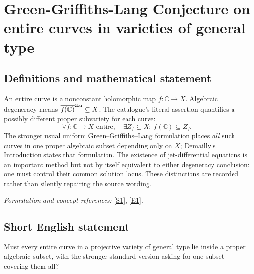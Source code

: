 \documentclass[11pt]{article}
\begin{document}
\section*{\texorpdfstring{Green-Griffiths-Lang Conjecture on entire curves in varieties of general type}{Green-Griffiths-Lang Conjecture on entire curves in varieties of general type}}\label{30006726}
\subsection{Definitions and mathematical statement}
An entire curve is a nonconstant holomorphic map $f:{\mathbb{C}}\to X$. Algebraic degeneracy means $\overline{f({\mathbb{C}})}^{\rm Zar}\subsetneq X$. The catalogue's literal assertion quantifies a possibly different proper subvariety for each curve:
\[
 \forall f:{\mathbb{C}}\to X\text{ entire},\quad\exists Z_f\subsetneq X:\ f({\mathbb{C}})\subseteq Z_f.
\]
The stronger usual uniform Green--Griffiths--Lang formulation places \emph{all} such curves in one proper algebraic subset depending only on $X$; Demailly's Introduction states that formulation. The existence of jet-differential equations is an important method but not by itself equivalent to either degeneracy conclusion: one must control their common solution locus. These distinctions are recorded rather than silently repairing the source wording.
\par\smallskip\textit{Formulation and concept references:} \href{https://arxiv.org/abs/1011.3636}{[S1]}, \href{https://arxiv.org/html/1011.3636v2}{[E1]}.

\subsection{Short English statement}
Must every entire curve in a projective variety of general type lie inside a proper algebraic subset, with the stronger standard version asking for one subset covering them all?
\end{document}
